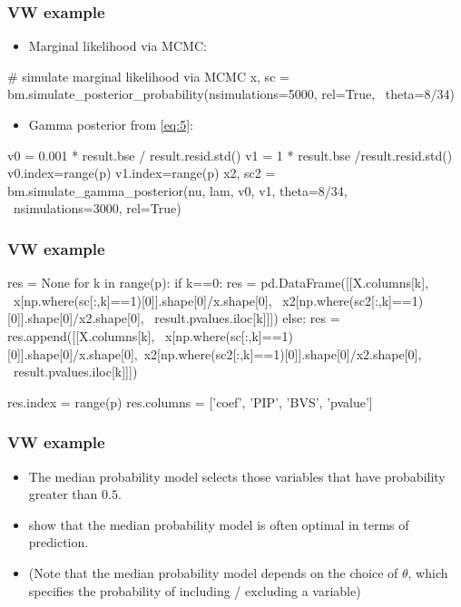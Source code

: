 \documentclass[xcolor=table,10pt]{beamer}
\begin{document}
\begin{frame}[fragile]
  \frametitle{VW example}
  \begin{itemize}
  \item Marginal likelihood via MCMC:
  \end{itemize}
{\scriptsize%
\begin{pyconsole}[vw][frame=single]
# simulate marginal likelihood via MCMC
x, sc = bm.simulate_posterior_probability(nsimulations=5000, rel=True, \
         theta=8/34)
\end{pyconsole}
}

\begin{itemize}
\item Gamma posterior from \eqref{eq:5}: 
\end{itemize}
{\scriptsize%
\begin{pyconsole}[vw][frame=single]
v0 = 0.001 * result.bse / result.resid.std()
v1 = 1 * result.bse /result.resid.std()
v0.index=range(p)
v1.index=range(p)
x2, sc2 = bm.simulate_gamma_posterior(nu, lam, v0, v1, theta=8/34, \
         nsimulations=3000, rel=True)
\end{pyconsole}
}
\end{frame}

\begin{frame}[fragile]
  \frametitle{VW example}
{\scriptsize%
\begin{pyconsole}[vw][frame=single]
res = None
for k in range(p):
    if k==0:
        res = pd.DataFrame([[X.columns[k], \
                         x[np.where(sc[:,k]==1)[0]].shape[0]/x.shape[0], \
                         x2[np.where(sc2[:,k]==1)[0]].shape[0]/x2.shape[0], \
                         result.pvalues.iloc[k]]])
    else:
        res = res.append([[X.columns[k], \
                         x[np.where(sc[:,k]==1)[0]].shape[0]/x.shape[0],\
                         x2[np.where(sc2[:,k]==1)[0]].shape[0]/x2.shape[0], \
                         result.pvalues.iloc[k]]])

res.index = range(p)
res.columns = ['coef', 'PIP', 'BVS', 'pvalue']
\end{pyconsole}
}
\end{frame}

\begin{frame}
  \frametitle{VW example}
  \begin{itemize}
  \item The \alert{median probability model} selects those variables
    that have probability greater than $0.5$.
  \item \citep{Barbieri2004} show that the median probability model is
    often optimal in terms of prediction.
  \item (Note that the median probability model depends on the choice
    of $\theta$, which specifies the probability of including /
    excluding a variable)
  \end{itemize}
\end{frame}
\end{document}
